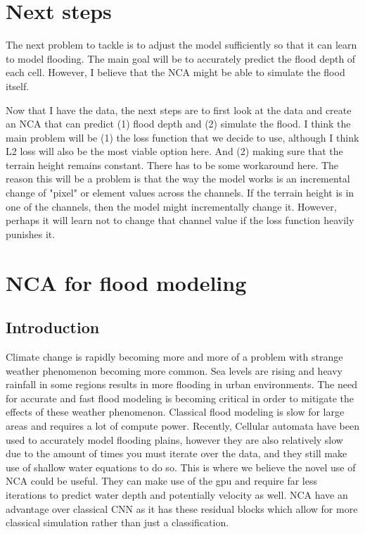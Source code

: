 \documentclass{article}
\begin{document}
\section{Next steps}
	The next problem to tackle is to adjust the model sufficiently so that it can learn to model flooding. The main goal will be to accurately predict the flood depth of each cell. However, I believe that the NCA might be able to simulate the flood itself.
	
	Now that I have the data, the next steps are to first look at the data and create an NCA that can predict (1) flood depth and (2) simulate the flood. I think the main problem will be (1) the loss function that we decide to use, although I think L2 loss will also be the most viable option here. And (2) making sure that the terrain height remains constant. There has to be some workaround here. The reason this will be a problem is that the way the model works is an incremental change of "pixel" or element values across the channels. If the terrain height is in one of the channels, then the model might incrementally change it. However, perhaps it will learn not to change that channel value if the loss function heavily punishes it.
\section{NCA for flood modeling}
\subsection{Introduction}
	Climate change is rapidly becoming more and more of a problem with strange weather phenomenon becoming more common. Sea levels are rising and heavy rainfall in some regions results in more flooding in urban environments. The need for accurate and fast flood modeling is becoming critical in order to mitigate the effects of these weather phenomenon. Classical flood modeling is slow for large areas and requires a lot of compute power. Recently, Cellular automata have been used to accurately model flooding plains, however they are also relatively slow due to the amount of times you must iterate over the data, and they still make use of shallow water equations to do so. This is where we believe the novel use of NCA could be useful. They can make use of the gpu and require far less iterations to predict water depth and potentially velocity as well. NCA have an advantage over classical CNN as it has these residual blocks which allow for more classical simulation rather than just a classification.
\end{document}
